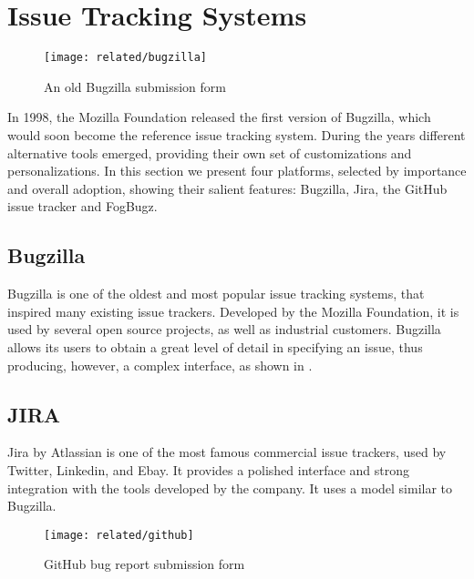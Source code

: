 \section{Issue Tracking Systems}\label{sec:bugtrackers}

\begin{figure}[t]
\centering
  \vspace{-12pt}
  \texttt{[image: related/bugzilla]}
  \caption{An old Bugzilla submission form}
  \label{fig:bugzilla-interface}
\end{figure}

In 1998, the Mozilla Foundation released the first version of Bugzilla, which would soon become the reference issue tracking system.
During the years different alternative tools emerged, providing their own set of customizations and personalizations.
In this section we present four platforms, selected by importance and overall adoption, showing their salient features: Bugzilla, Jira, the GitHub issue tracker and FogBugz.


\subsection{Bugzilla}

Bugzilla  is one of the oldest and most popular issue tracking systems, that inspired many existing issue trackers. Developed by the Mozilla Foundation, it is used by several open source projects, as well as industrial customers. Bugzilla allows its users to obtain a great level of detail in specifying an issue, thus producing, however, a complex interface, as shown in .


\subsection{JIRA}

Jira by Atlassian is one of the most famous commercial issue trackers, used by Twitter, Linkedin, and Ebay. It provides a polished interface and strong integration with the tools developed by the company. It uses a model similar to Bugzilla.

\begin{figure}[t]
\centering
 \texttt{[image: related/github]}
 \caption{GitHub bug report submission form}
 \label{fig:github-interface}
\end{figure}

